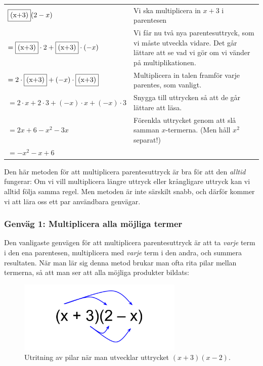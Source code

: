 \smallskip
\begin{tabular}{l|p{5.7cm}}
  $\framebox{(x+3)} (2-x)$ & Vi ska multiplicera in $x+3$ i parentesen \\
  $= \framebox{(x+3)} \cdot 2 + \framebox{(x+3)} \cdot (-x)$ & Vi får nu två nya parentesuttryck, som vi måste utveckla vidare. Det går lättare att se vad vi gör om vi vänder på multiplikationen. \\
  $=2 \cdot \framebox{(x+3)} + (-x) \cdot \framebox{(x+3)}$ & Multiplicera in talen framför varje parentes, som vanligt. \\
  $=2 \cdot x + 2 \cdot 3 + (-x) \cdot x + (-x) \cdot 3$ & Snygga till uttrycken så att de går lättare att läsa. \\
  $=2x + 6 - x^2  - 3x$ & Förenkla uttrycket genom att slå samman $x$-termerna. (Men håll $x^2$ separat!) \\
  $=-x^2 - x + 6$ & \\
\end{tabular}
\smallskip

Den här metoden för att multiplicera parentesuttryck är bra för att den \emph{alltid} fungerar:
Om vi vill multiplicera längre uttryck eller krångligare uttryck kan vi alltid följa samma regel.
Men metoden är inte särskilt snabb, och därför kommer vi att lära oss ett par användbara genvägar.

\subsubsection{Genväg 1: Multiplicera alla möjliga termer}

Den vanligaste genvägen för att multiplicera parentesuttryck är att ta \emph{varje} term i den ena parentesen, multiplicera med \emph{varje} term i den andra, och summera resultaten.
När man lär sig denna metod brukar man ofta rita pilar mellan termerna, så att man ser att alla möjliga produkter bildats:

\begin{figure}
  \centering
  \includegraphics[width=0.7\textwidth]{bilder/parentesmultiplikation.svg}
  \caption{\label{fig:parentesmultiplikation}Utritning av pilar när man utvecklar uttrycket $(x+3)(x-2)$.}
\end{figure}

